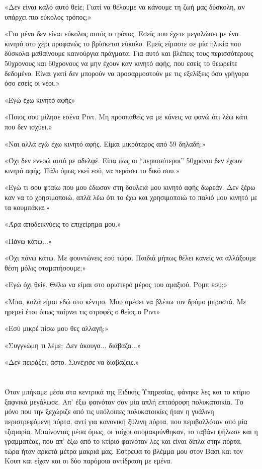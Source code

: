 \documentclass[12pt,twoside, openany]{book}
\begin{document}
«Δεν είναι καλό αυτό θείε; Γιατί να θέλουμε να κάνουμε τη ζωή μας δύσκολη, αν υπάρχει πιο εύκολος τρόπος;»

«Για μένα δεν είναι εύκολος αυτός ο τρόπος. Εσείς που έχετε μεγαλώσει με ένα κινητό στο χέρι προφανώς το βρίσκεται εύκολο. Εμείς είμαστε σε μία ηλικία που δύσκολα μαθαίνουμε καινούργια πράγματα. Για αυτό και βλέπεις τους περισσότερους 50χρονους και 60χρονους να μην έχουν καν κινητό αφής, που εσείς το θεωρείτε δεδομένο. Είναι γιατί δεν μπορούν να προσαρμοστούν με τις εξελίξεις όσο γρήγορα όσο εσείς οι νέοι.»

«Εγώ έχω κινητό αφής»

«Ποιος σου μίλησε εσένα Ριντ. Μη προσπαθείς να με κάνεις να φανώ ότι λέω κάτι που δεν ισχύει.»

«Ναι αλλά εγώ έχω κινητό αφής. Είμαι μικρότερος από 59 δηλαδή;»

«Όχι δεν εννοώ αυτό ρε αδελφέ. Είπα πως οι “περισσότεροι” 50χρονοι δεν έχουν κινητό αφής. Πάλι όμως εκεί εσύ, να περάσει το δικό σου.»

«Εγώ τι σου φταίω που μου έδωσαν στη δουλειά μου κινητό αφής δωρεάν. Δεν ξέρω καν να το χρησιμοποιώ, απλά λέω ότι το έχω και χρησιμοποιώ το παλιό μου κινητό με τα κουμπάκια.»

«Άρα αποδεικνύεις το επιχείρημα μου.»

«Πάνω κάτω...»

«Όχι πάνω κάτω. Με φουντώνεις εσύ τώρα. Παιδιά μήπως θέλει κανείς να αλλάξουμε θέση μόλις σταματήσουμε;»

«Εγώ όχι θείε. Θέλω να είμαι στο αριστερό μέρος του αμαξιού. Ρομπ εσύ;»

«Μπα, καλά είμαι εδώ στο κέντρο. Μου αρέσει να βλέπω τον δρόμο μπροστά. Με ηρεμεί έτσι όπως παίρνει τις στροφές ο θείος ο Ριντ»

«Εσύ μικρέ πίσω μου θες αλλαγή;»

«Συγγνώμη τι λέμε; Δεν άκουγα... διάβαζα...»

«Δεν πειράζει, άστο. Συνέχισε να διαβάζεις.»

\chapter{}

Όταν μπήκαμε μέσα στα κεντρικά της Ειδικής Υπηρεσίας, φάνηκε λες και το κτίριο ξαφνικά μεγάλωσε. Απ’ έξω φαινόταν σαν μία απλή επταόροφη πολυκατοικία. Το μόνο που την ξεχώριζε από τις υπόλοιπες πολυκατοικίες ήταν η γυάλινη περιστρεφόμενη πόρτα, αντί για κανονική ξύλινη πόρτα, που περιβαλλόταν από μία τζαμαρία. Μπαίνοντας μέσα όμως, οι τοίχοι απομακρύνθηκαν, το ταβάνι ψήλωσε και η γραμματέας, που απ’ έξω από το κτίριο φαινόταν λες και είναι δίπλα στην πόρτα, τώρα ήταν αρκετά μέτρα μακριά μας. Έστρεψα το βλέμμα μου στον Βασι και τον Κουπ και είχαν και οι δύο παρόμοια αντίδραση με εμένα.
\end{document}
